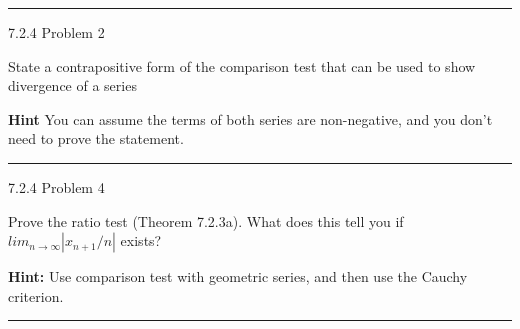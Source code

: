 \documentclass[11pt]{article}
\begin{document}
\hrule





 7.2.4 Problem 2

State a contrapositive form of the comparison test that can be used to show divergence of a series

\textbf{Hint} You can assume the terms of both series are non-negative, and you don't need to prove the statement.



\hrule





 7.2.4 Problem 4

Prove the ratio test (Theorem 7.2.3a). What does this tell you if $lim_{n \to \infty} |x_{n+1} / n|$ exists?

\textbf{Hint: } Use comparison test with geometric series, and then use the Cauchy criterion.

\hrule
\end{document}
